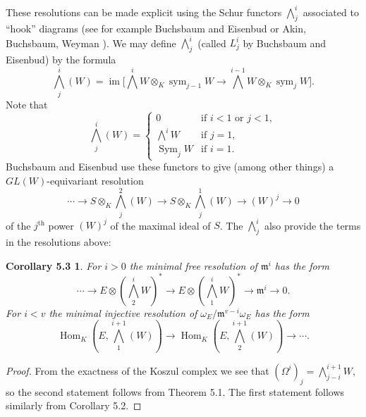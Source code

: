 \documentclass{tran-l}
\newcommand{\myim}{\operatorname{im}}
\newcommand{\myHom}{\operatorname{Hom}}
\newcommand{\Sym}{\operatorname{Sym}}
\newcommand{\sym}{\operatorname{sym}}
\newcommand{\myth}{{\operatorname{th}}}
\newcommand{\gm}{{\mathfrak{m}}}
\theoremstyle{plain}
\newtheorem*{theorem21}{Corollary 5.3}
\theoremstyle{remark}
\theoremstyle{definition}
\begin{document}
These resolutions can be made explicit using
the Schur functors $\bigwedge ^{i}_{j}$ associated to ``hook'' diagrams
(see for example
Buchsbaum and Eisenbud \cite{BE} or
Akin, Buchsbaum, Weyman \cite{ABW}).
We may define
$\bigwedge ^{i}_{j}$ (called $L^{i}_{j}$ by Buchsbaum and Eisenbud)
by the formula
\begin{equation*}\textstyle{\bigwedge ^{i}_{j}}(W)=\myim \bigl 
[\textstyle{\bigwedge ^{i}}W\otimes _{K}\sym _{j-1}W\to 
\textstyle{\bigwedge ^{i-1}}W\otimes _{K}\sym _{j}W\bigr ].
\end{equation*}
Note that
\begin{equation*}\textstyle{\bigwedge ^{i}_{j}}(W)=\begin{cases}0 & 
\text{if $i<1$ or $j<1$},\\
                     \bigwedge ^{i}W & \text{if $j=1$},\\
                     \Sym _{j}W & \text{if $i=1$}.\end{cases}
\end{equation*}
Buchsbaum and Eisenbud use these functors to
give (among other things)
a $GL(W)$-equivariant resolution
\begin{equation*}\cdots \to S\otimes _{K}\textstyle{\bigwedge ^{2}_{j}}(W)
\to S\otimes _{K}\textstyle{\bigwedge ^{1}_{j}}(W)
\to (W)^{j}
\to 0
\end{equation*}
of the $j^{\myth }$ power
$(W)^{j}$ of the maximal ideal of $S$.
The $\bigwedge ^{i}_{j}$ also provide the terms in the resolutions above:
\begin{theorem21}
For $i>0$ the minimal free resolution of $\gm ^{i}$ has the form
\begin{equation*}\cdots \to E\otimes (\textstyle{\bigwedge ^{i}_{2}} W)^{*}\to E\otimes
(\textstyle{\bigwedge ^{i}_{1}} W)^{*}\to \gm ^{i}
\to 0.
\end{equation*}
For $i< v$ the minimal injective resolution of
$\omega _{E}/\gm ^{v-i}\omega _{E}$ has the form
\begin{equation*}\myHom _{K}(E, \textstyle{\bigwedge ^{i+1}_{1}}(W))\to \myHom _{K}(E, 
\textstyle{\bigwedge ^{i+1}_{2}}(W))\to \cdots .
\end{equation*}
\end{theorem21}
\begin{proof}  From the exactness of the Koszul complex we see that
$(\Omega ^{i})_{j} = \bigwedge ^{i+1}_{j-i}W,
$
so the second statement follows from Theorem 5.1.
The first statement follows similarly from
Corollary 5.2. \end{proof}
\end{document}
